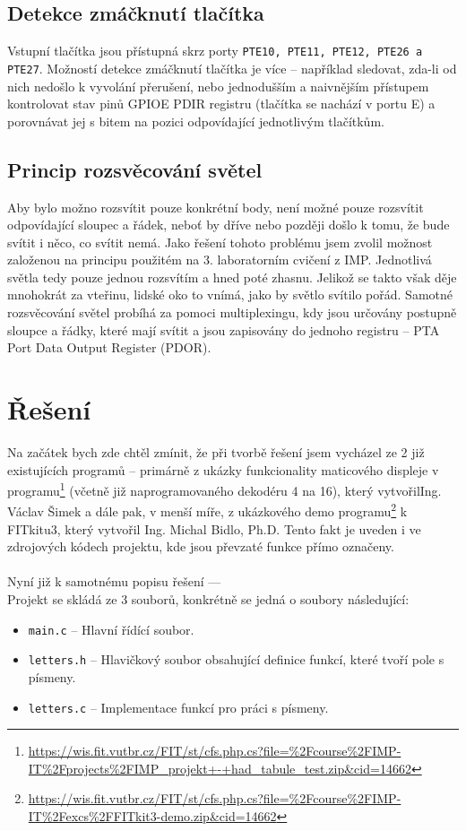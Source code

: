 \documentclass[14pt]{extarticle}
\begin{document}
    \newpage
    \subsection{Detekce zmáčknutí tlačítka}
    Vstupní tlačítka jsou přístupná skrz porty \texttt{PTE10, PTE11, PTE12, PTE26 a PTE27}. Možností detekce zmáčknutí tlačítka  je více -- například sledovat, zda-li od nich nedošlo k vyvolání přerušení, nebo jednodušším a naivnějším přístupem kontrolovat stav pinů GPIOE PDIR registru (tlačítka se nachází v portu E) a porovnávat jej s bitem na pozici odpovídající jednotlivým tlačítkům.
    
    \subsection{Princip rozsvěcování světel}
    Aby bylo možno rozsvítit pouze konkrétní body, není možné pouze rozsvítit odpovídající sloupec a řádek, neboť by dříve nebo později došlo k tomu, že bude svítit i něco, co svítit nemá. Jako řešení tohoto problému jsem zvolil možnost založenou na principu použitém na 3. laboratorním cvičení z IMP. Jednotlivá světla tedy pouze jednou rozsvítím a hned poté zhasnu. Jelikož se takto však děje mnohokrát za vteřinu, lidské oko to vnímá, jako by světlo svítilo pořád. Samotné rozsvěcování světel probíhá za pomoci multiplexingu, kdy jsou určovány postupně sloupce a řádky, které mají svítit a jsou zapisovány do jednoho registru -- PTA Port Data Output Register (PDOR).
    
    \section{Řešení}
    Na začátek bych zde chtěl zmínit, že při tvorbě řešení jsem vycházel ze 2 již existujících programů -- primárně z ukázky funkcionality maticového displeje v programu\footnote{\url{https://wis.fit.vutbr.cz/FIT/st/cfs.php.cs?file=\%2Fcourse\%2FIMP-IT\%2Fprojects\%2FIMP_projekt+-+had_tabule_test.zip&cid=14662}} (včetně již naprogramovaného dekodéru 4 na 16), který vytvořil\break Ing. Václav Šimek a dále pak, v menší míře, z ukázkového demo programu\footnote{\url{https://wis.fit.vutbr.cz/FIT/st/cfs.php.cs?file=\%2Fcourse\%2FIMP-IT\%2Fexcs\%2FFITkit3-demo.zip&cid=14662}} k FITkitu3, který vytvořil Ing. Michal Bidlo, Ph.D. Tento fakt je uveden i ve zdrojových kódech projektu, kde jsou převzaté funkce přímo označeny.
    \\\\
    Nyní již k samotnému popisu řešení ---
    \\
    Projekt se skládá ze 3 souborů, konkrétně se jedná o soubory následující:
    \begin{itemize}
    \setlength\itemsep{1pt}
    \item \texttt{main.c} -- Hlavní řídící soubor.
    \item \texttt{letters.h} -- Hlavičkový soubor obsahující definice funkcí, které tvoří pole s písmeny.
    \item \texttt{letters.c} -- Implementace funkcí pro práci s písmeny.
    \end{itemize}
    
\end{document}
